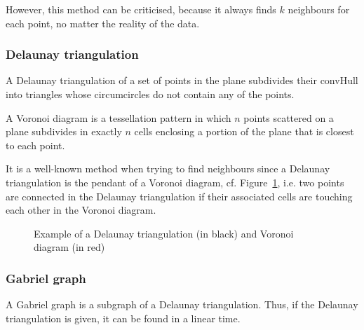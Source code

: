 \documentclass[lettersize,journal,english]{IEEEtran}
\begin{document}
However, this method can be criticised, because it always finds $k$ neighbours for each point, no matter the reality of the 
data.

\subsubsection{Delaunay triangulation}
A Delaunay triangulation \cite{art_delaunay} of a set of points in the plane subdivides their \gls{convHull} into triangles whose circumcircles 
do not contain any of the points.

A Voronoi diagram is a tessellation pattern in which $n$ points scattered on a plane subdivides in 
exactly $n$ cells enclosing a portion of the plane that is closest to each point. 

It is a well-known method when trying to find neighbours \cite{delaunay_neighbor}
since a Delaunay triangulation is the pendant of a Voronoi diagram, cf. Figure~\ref{fig:del_tri}, i.e. two points are connected in the
Delaunay triangulation if their associated cells are touching each other in the Voronoi diagram.

\begin{figure}
    \centering
    \caption{Example of a Delaunay triangulation (in black) and Voronoi diagram (in red)}
    \label{fig:del_tri}
\end{figure}

\subsubsection{Gabriel graph}
A Gabriel graph \cite{10.2307/2412323} is a subgraph of a Delaunay triangulation. Thus, if the Delaunay triangulation is given, it can be found in a linear time. 
\end{document}
